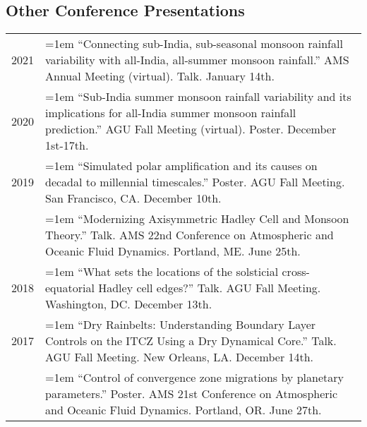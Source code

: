\documentclass[letterpaper,11pt]{shillcv}
\begin{document}
\subsection*{Other Conference Presentations}
\begin{longtable}{@{} >{\color{darkgray}} p{} p{} @{}}
2021 & \hangindent=1em ``Connecting sub-India, sub-seasonal monsoon rainfall variability with all-India, all-summer monsoon rainfall.'' AMS Annual Meeting (virtual).  Talk.  January 14th.\\
2020 & \hangindent=1em ``Sub-India summer monsoon rainfall variability and its implications for all-India summer monsoon rainfall prediction.''  AGU Fall Meeting (virtual).  Poster.  December 1st-17th.\\
2019 & \hangindent=1em ``Simulated polar amplification and its causes on decadal to millennial timescales.''  Poster.  AGU Fall Meeting.  San Francisco, CA.  December 10th.\\
     & \hangindent=1em ``Modernizing Axisymmetric Hadley Cell and Monsoon Theory.''  Talk.  AMS 22nd Conference on Atmospheric and Oceanic Fluid Dynamics.  Portland, ME.  June 25th.\\
2018 & \hangindent=1em ``What sets the locations of the solsticial cross-equatorial Hadley cell edges?''  Talk.  AGU Fall Meeting.  Washington, DC.  December 13th.\\
2017 & \hangindent=1em ``Dry Rainbelts: Understanding Boundary Layer Controls on the ITCZ Using a Dry Dynamical Core.''  Talk.  AGU Fall Meeting.  New Orleans, LA.  December 14th.\\
     & \hangindent=1em ``Control of convergence zone migrations by planetary parameters.''  Poster.  AMS 21st Conference on Atmospheric and Oceanic Fluid Dynamics.  Portland, OR.  June 27th.\\

\end{longtable}
\end{document}
